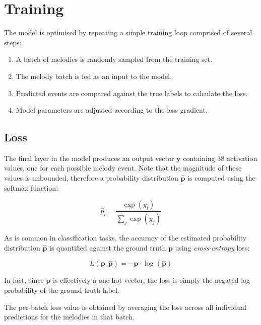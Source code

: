 \documentclass[../../report.tex]{subfiles}
\begin{document}
\section{Training}

The model is optimised by repeating a simple training loop comprised of several
steps:

\begin{enumerate}
  \item A batch of melodies is randomly sampled from the training set.

  \item The melody batch is fed as an input to the model.

  \item Predicted events are compared against the true labels to calculate the
  loss.

  \item Model parameters are adjusted according to the loss gradient.
\end{enumerate}

\subsection{Loss}

The final layer in the model produces an output vector \(\bm{y}\) containing 38
activation values, one for each possible melody event. Note that the magnitude
of these values is unbounded, therefore a probability distribution
\(\bm{\hat{p}}\) is computed using the softmax function:

\begin{equation}
  \hat{p}_i = \frac{ \exp(y_i) }{ \sum_{j} \exp(y_j) }
\end{equation}

As is common in classification tasks, the accuracy of the estimated probability
distribution \(\bm{\hat{p}}\) is quantified against the ground truth \(\bm{p}\)
using \emph{cross-entropy} loss:

\begin{equation}
  L(\bm{p}, \bm{\hat{p}}) = - \bm{p} \cdot \log(\bm{\hat{p}})
\end{equation}

In fact, since \(\bm{p}\) is effectively a one-hot vector, the loss is simply
the negated log probability of the ground truth label.

The per-batch loss value is obtained by averaging the loss across all individual
predictions for the melodies in that batch.
\end{document}
